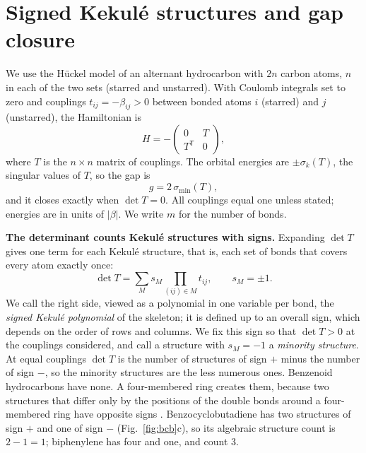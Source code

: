 \documentclass[11pt]{article}
\newcommand{\T}{\mathsf{T}}
\begin{document}
\section{Signed Kekul\'e structures and gap closure}
\label{sec:model}

We use the H\"uckel model of an alternant hydrocarbon with $2n$ carbon atoms, $n$ in each of the two sets (starred and unstarred). With Coulomb integrals set to zero and couplings $t_{ij}=-\beta_{ij}>0$ between bonded atoms $i$ (starred) and $j$ (unstarred), the Hamiltonian is
\begin{equation}
H=-\begin{pmatrix}0&T\\T^\T&0\end{pmatrix},
\end{equation}
where $T$ is the $n\times n$ matrix of couplings. The orbital energies are $\pm\sigma_k(T)$, the singular values of $T$, so the gap is
\begin{equation}
g=2\,\sigma_{\min}(T),
\end{equation}
and it closes exactly when $\det T=0$. All couplings equal one unless stated; energies are in units of $|\beta|$. We write $m$ for the number of bonds.

\textbf{The determinant counts Kekul\'e structures with signs.} Expanding $\det T$ gives one term for each Kekul\'e structure, that is, each set of bonds that covers every atom exactly once:
\begin{equation}
\det T=\sum_{M}s_M\prod_{(ij)\in M}t_{ij},\qquad s_M=\pm1 .
\label{eq:expansion}
\end{equation}
We call the right side, viewed as a polynomial in one variable per bond, the \emph{signed Kekul\'e polynomial} of the skeleton; it is defined up to an overall sign, which depends on the order of rows and columns. We fix this sign so that $\det T>0$ at the couplings considered, and call a structure with $s_M=-1$ a \emph{minority structure}. At equal couplings $\det T$ is the number of structures of sign $+$ minus the number of sign $-$, so the minority structures are the less numerous ones. Benzenoid hydrocarbons have none. A four-membered ring creates them, because two structures that differ only by the positions of the double bonds around a four-membered ring have opposite signs \cite{DewarLH1952}. Benzocyclobutadiene has two structures of sign $+$ and one of sign $-$ (Fig.~\ref{fig:bcb}c), so its algebraic structure count is $2-1=1$; biphenylene has four and one, and count 3.
\end{document}

